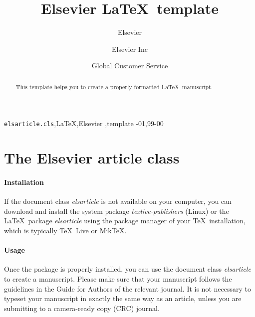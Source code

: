 \documentclass[review]{elsarticle}
\begin{document}
\begin{frontmatter}

\title{Elsevier \LaTeX\ template}

\author{Elsevier}
\address{Radarweg 29, Amsterdam}

\author[mymainaddress,mysecondaryaddress]{Elsevier Inc}

\author[mysecondaryaddress]{Global Customer Service}

\address[mymainaddress]{1600 John F Kennedy Boulevard, Philadelphia}
\address[mysecondaryaddress]{360 Park Avenue South, New York}

\begin{abstract}
This template helps you to create a properly formatted \LaTeX\ manuscript.
\end{abstract}

\begin{keyword}
\texttt{elsarticle.cls}\sep \LaTeX\sep Elsevier \sep template
-01\sep  99-00
\end{keyword}

\end{frontmatter}

\linenumbers

\section{The Elsevier article class}

\paragraph{Installation} If the document class \emph{elsarticle} is not available on your computer, you can download and install the system package \emph{texlive-publishers} (Linux) or the \LaTeX\ package \emph{elsarticle} using the package manager of your \TeX\ installation, which is typically \TeX\ Live or Mik\TeX.

\paragraph{Usage} Once the package is properly installed, you can use the document class \emph{elsarticle} to create a manuscript. Please make sure that your manuscript follows the guidelines in the Guide for Authors of the relevant journal. It is not necessary to typeset your manuscript in exactly the same way as an article, unless you are submitting to a camera-ready copy (CRC) journal.
\end{document}
